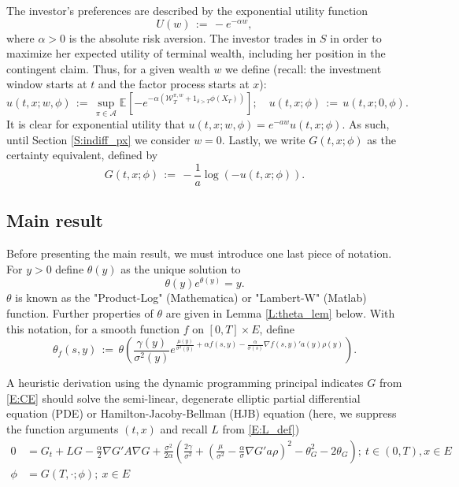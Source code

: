 \documentclass[11pt, letterpaper]{amsart}
\theoremstyle{definition}
\theoremstyle{remark}
\numberwithin{equation}{section}
\newcommand{\We}{\mathcal{W}}
\newcommand{\esp}{\mathbb{E}}
\newcommand{\espalt}[2]{\esp^{#1}\bra{#2}}
\newcommand{\dfn}{\, := \,}
\newcommand{\bra}[1]{\left[#1\right]}
\begin{document}
The investor's preferences are described by the exponential utility function
\begin{equation}\label{E:U}
U(w) \dfn -e^{-\alpha w},
\end{equation}
where $\alpha>0$ is the absolute risk aversion.  The investor trades in $S$ in order to maximize her expected utility of terminal wealth, including her position in the contingent claim.  Thus, for a given wealth $w$ we define (recall: the investment window starts at $t$ and the factor process starts at $x$):
\begin{equation}\label{E:util_funct}
u(t,x;w,\phi) \dfn \sup_{\pi\in\mathcal{A}}\espalt{}{-e^{-\alpha\left(\We^{\pi,w}_T + 1_{\delta>T}\phi(X_T)\right)}};\quad u(t,x;\phi)\dfn u(t,x;0,\phi).
\end{equation}
It is clear for exponential utility that $u(t,x;w,\phi) = e^{-aw}u(t,x;\phi)$.  As such, until Section \ref{S:indiff_px} we consider $w=0$. Lastly, we write $G(t,x;\phi)$ as the certainty equivalent, defined by
\begin{equation}\label{E:CE}
G(t,x;\phi) \dfn -\frac{1}{a}\log\left(-u(t,x;\phi)\right).
\end{equation}

\subsection{Main result}\label{SS:main_results}

Before presenting the main result, we must introduce one last piece of notation.  For $y>0$ define $\theta(y)$ as the unique solution to
\begin{equation}\label{E:theta_def}
\theta(y) e^{\theta(y)} = y.
\end{equation}
$\theta$ is known as the  "Product-Log" (Mathematica) or "Lambert-W" (Matlab) function.  Further properties of $\theta$ are given in Lemma \ref{L:theta_lem} below.  With this notation, for a smooth function $f$ on $[0,T]\times E$, define
\begin{equation}\label{E:theta_f}
\theta_f(s,y) \dfn \theta\left(\frac{\gamma(y)}{\sigma^2(y)} e^{\frac{\mu(y)}{\sigma^2(y)} + \alpha f(s,y) - \frac{\alpha}{\sigma(s)}\nabla f(s,y)'a(y)\rho(y)}\right).
\end{equation}

A heuristic derivation using the dynamic programming principal indicates $G$ from \eqref{E:CE} should solve the semi-linear, degenerate elliptic partial differential equation (PDE) or Hamilton-Jacoby-Bellman (HJB) equation (here, we suppress the function arguments $(t,x)$ and recall $L$ from \eqref{E:L_def})
\begin{equation}\label{E:G_PDE}
\begin{split}
0 & = G_t + LG - \frac{\alpha}{2}\nabla G'A\nabla G + \frac{\sigma^2}{2\alpha}\left(\frac{2\gamma}{\sigma^2} + \left(\frac{\mu}{\sigma^2} - \frac{\alpha}{\sigma}\nabla G'a\rho\right)^2 -\theta_G^2 - 2\theta_G\right);\ t\in (0,T),x\in E\\
\phi & = G(T,\cdot;\phi);\ x\in E
\end{split}
\end{equation}
\end{document}
